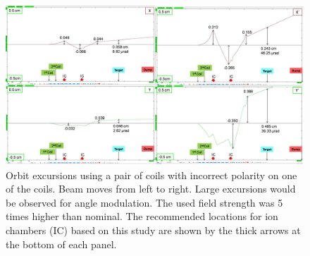\begin{singlespace}
\begin{figure}[!h]
	\begin{center}
	\includegraphics[width=15.0cm]{figures/BModMachineProtectionAllPair}
	\end{center}
	\caption
	{Orbit excursions using a pair of coils with incorrect polarity on one of the coils. Beam moves from left to right. Large excursions would be observed for angle modulation. The used field strength was 5 times higher than nominal. The recommended locations for ion chambers (IC) based on this study are shown by the thick arrows at the bottom of each panel.}
	\label{fig:BModMachineProtectionAllPair}
\end{figure}
\end{singlespace}


